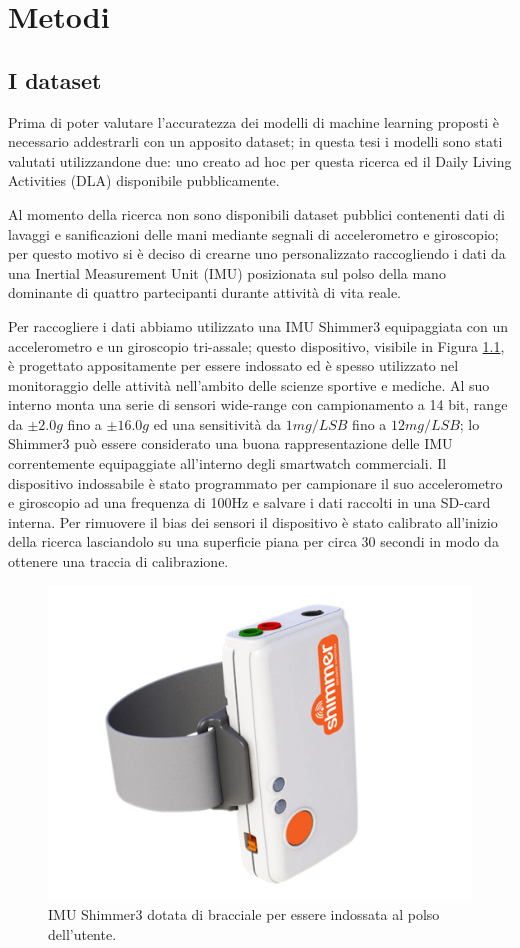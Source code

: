 \chapter{Metodi}
\label{cap:metodi}

\section{I dataset}
\label{sec:dataset}

Prima di poter valutare l'accuratezza dei modelli di machine learning proposti è necessario addestrarli con un apposito dataset; in questa tesi i modelli sono stati valutati utilizzandone due: uno creato ad hoc per questa ricerca ed il Daily Living Activities (DLA) disponibile pubblicamente\cite{leotta2021daily}.

Al momento della ricerca non sono disponibili dataset pubblici contenenti dati di lavaggi e sanificazioni delle mani mediante segnali di accelerometro e giroscopio; per questo motivo si è deciso di crearne uno personalizzato raccogliendo i dati da una Inertial Measurement Unit (IMU) posizionata sul polso della mano dominante di quattro partecipanti durante attività di vita reale.

Per raccogliere i dati abbiamo utilizzato una IMU Shimmer3 equipaggiata con un accelerometro e un giroscopio tri-assale\cite{shimmer}; questo dispositivo, visibile in Figura \ref{fig:shimmer}, è progettato appositamente per essere indossato ed è spesso utilizzato nel monitoraggio delle attività nell'ambito delle scienze sportive e mediche. Al suo interno monta una serie di sensori wide-range con campionamento a 14 bit, range da $\pm2.0g$ fino a $\pm16.0g$ ed una sensitività da $1mg/LSB$ fino a $12mg/LSB$; lo Shimmer3 può essere considerato una buona rappresentazione delle IMU correntemente equipaggiate all'interno degli smartwatch commerciali. Il dispositivo indossabile è stato programmato per campionare il suo accelerometro e giroscopio ad una frequenza di 100Hz e salvare i dati raccolti in una SD-card interna. Per rimuovere il bias dei sensori il dispositivo è stato calibrato all'inizio della ricerca lasciandolo su una superficie piana per circa 30 secondi in modo da ottenere una traccia di calibrazione.

\begin{figure}[!htb]
    \centering
    \includegraphics[width=.4\textwidth]{figure/shimmer.jpg}
    \caption{IMU Shimmer3 dotata di bracciale per essere indossata al polso dell'utente.}
    \label{fig:shimmer}
\end{figure}

